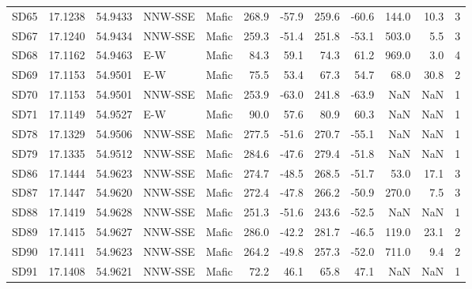 \begin{tabular}{lrrllrrrrrrr}
SD65 & 17.1238 & 54.9433 &     NNW-SSE &  Mafic  &        268.9 &        -57.9 &       259.6 &       -60.6 &   144.0 &         10.3 &                3 \\
SD67 & 17.1240 & 54.9434 &     NNW-SSE &  Mafic  &        259.3 &        -51.4 &       251.8 &       -53.1 &   503.0 &          5.5 &                3 \\
SD68 & 17.1162 & 54.9463 &         E-W &  Mafic  &         84.3 &         59.1 &        74.3 &        61.2 &   969.0 &          3.0 &                4 \\
SD69 & 17.1153 & 54.9501 &         E-W &  Mafic  &         75.5 &         53.4 &        67.3 &        54.7 &    68.0 &         30.8 &                2 \\
SD70 & 17.1153 & 54.9501 &     NNW-SSE &  Mafic  &        253.9 &        -63.0 &       241.8 &       -63.9 &     NaN &          NaN &                1 \\
SD71 & 17.1149 & 54.9527 &         E-W &  Mafic  &         90.0 &         57.6 &        80.9 &        60.3 &     NaN &          NaN &                1 \\
SD78 & 17.1329 & 54.9506 &     NNW-SSE &  Mafic  &        277.5 &        -51.6 &       270.7 &       -55.1 &     NaN &          NaN &                1 \\
SD79 & 17.1335 & 54.9512 &     NNW-SSE &  Mafic  &        284.6 &        -47.6 &       279.4 &       -51.8 &     NaN &          NaN &                1 \\
SD86 & 17.1444 & 54.9623 &     NNW-SSE &  Mafic  &        274.7 &        -48.5 &       268.5 &       -51.7 &    53.0 &         17.1 &                3 \\
SD87 & 17.1447 & 54.9620 &     NNW-SSE &  Mafic  &        272.4 &        -47.8 &       266.2 &       -50.9 &   270.0 &          7.5 &                3 \\
SD88 & 17.1419 & 54.9628 &     NNW-SSE &  Mafic  &        251.3 &        -51.6 &       243.6 &       -52.5 &     NaN &          NaN &                1 \\
SD89 & 17.1415 & 54.9627 &     NNW-SSE &  Mafic  &        286.0 &        -42.2 &       281.7 &       -46.5 &   119.0 &         23.1 &                2 \\
SD90 & 17.1411 & 54.9623 &     NNW-SSE &  Mafic  &        264.2 &        -49.8 &       257.3 &       -52.0 &   711.0 &          9.4 &                2 \\
SD91 & 17.1408 & 54.9621 &     NNW-SSE &  Mafic  &         72.2 &         46.1 &        65.8 &        47.1 &     NaN &          NaN &                1 \\

\end{tabular}

